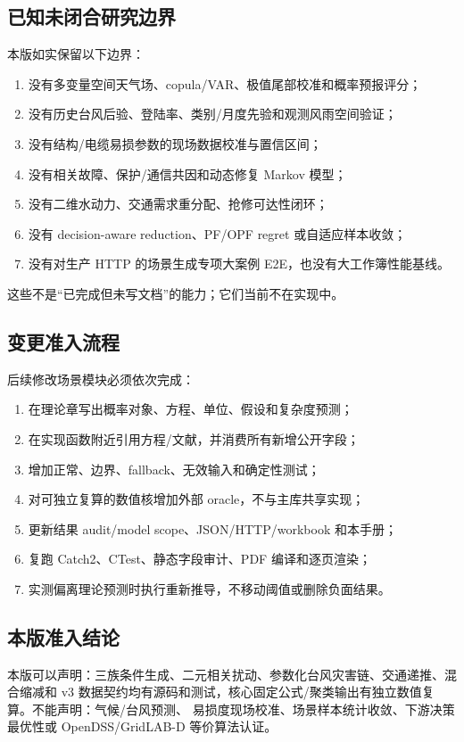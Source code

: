 \subsection{已知未闭合研究边界}
本版如实保留以下边界：
\begin{enumerate}
  \item 没有多变量空间天气场、copula/VAR、极值尾部校准和概率预报评分；
  \item 没有历史台风后验、登陆率、类别/月度先验和观测风雨空间验证；
  \item 没有结构/电缆易损参数的现场数据校准与置信区间；
  \item 没有相关故障、保护/通信共因和动态修复 Markov 模型；
  \item 没有二维水动力、交通需求重分配、抢修可达性闭环；
  \item 没有 decision-aware reduction、PF/OPF regret 或自适应样本收敛；
  \item 没有对生产 HTTP 的场景生成专项大案例 E2E，也没有大工作簿性能基线。
\end{enumerate}
这些不是“已完成但未写文档”的能力；它们当前不在实现中。

\subsection{变更准入流程}
后续修改场景模块必须依次完成：
\begin{enumerate}
  \item 在理论章写出概率对象、方程、单位、假设和复杂度预测；
  \item 在实现函数附近引用方程/文献，并消费所有新增公开字段；
  \item 增加正常、边界、fallback、无效输入和确定性测试；
  \item 对可独立复算的数值核增加外部 oracle，不与主库共享实现；
  \item 更新结果 audit/model scope、JSON/HTTP/workbook 和本手册；
  \item 复跑 Catch2、CTest、静态字段审计、PDF 编译和逐页渲染；
  \item 实测偏离理论预测时执行重新推导，不移动阈值或删除负面结果。
\end{enumerate}

\subsection{本版准入结论}
本版可以声明：三族条件生成、二元相关扰动、参数化台风灾害链、交通递推、混合缩减和 v3
数据契约均有源码和测试，核心固定公式/聚类输出有独立数值复算。不能声明：气候/台风预测、
易损度现场校准、场景样本统计收敛、下游决策最优性或 OpenDSS/GridLAB-D 等价算法认证。
